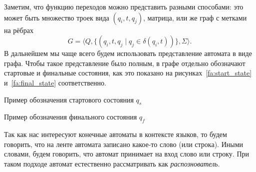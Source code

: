 Заметим, что функцию переходов можно представить разными способами: это может быть множество троек вида $(q_i, t, q_j)$, матрица, или же граф с метками на рёбрах 
\[G = \langle Q, \{(q_i,t,q_j \mid q_j \in \delta(q_i,t))\}, \Sigma \rangle.\]
В дальнейшем мы чаще всего будем использовать представление автомата в виде графа.
Чтобы такое представление было полным, в графе отдельно обозначают стартовые и финальные состояния, как это показано на рисунках~\ref{fa:start_state} и~\ref{fa:final_state} соответственно.
\begin{marginfigure}    
    \begin{center}
    \end{center}
    \caption{Пример обозначения стартового состояния $q_s$}
    \label{fa:start_state}
\end{marginfigure}
\begin{marginfigure}    
    \begin{center}
    \end{center}
    \caption{Пример обозначения финального состояния $q_f$}
    \label{fa:final_state}
\end{marginfigure}

Так как нас интересуют конечные автоматы в контексте языков, то будем говорить, что на ленте автомата записано какое-то слово (или строка).
Иными словами, будем говорить, что автомат принимает на вход слово или строку.
При таком подходе автомат естественно рассматривать как \emph{распознователь}.

